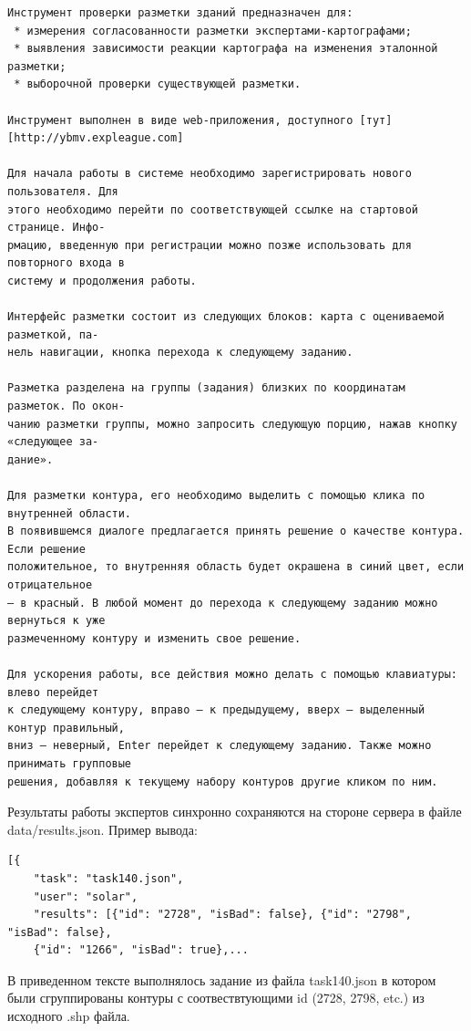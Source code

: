 \documentclass[12pt]{article}
\begin{document}
{\footnotesize\begin{verbatim}
Инструмент проверки разметки зданий предназначен для:
 * измерения согласованности разметки экспертами-картографами;
 * выявления зависимости реакции картографа на изменения эталонной разметки;
 * выборочной проверки существующей разметки.

Инструмент выполнен в виде web-приложения, доступного [тут][http://ybmv.expleague.com]

Для начала работы в системе необходимо зарегистрировать нового пользователя. Для
этого необходимо перейти по соответствующей ссылке на стартовой странице. Инфо-
рмацию, введенную при регистрации можно позже использовать для повторного входа в
систему и продолжения работы.

Интерфейс разметки состоит из следующих блоков: карта с оцениваемой разметкой, па-
нель навигации, кнопка перехода к следующему заданию.

Разметка разделена на группы (задания) близких по координатам разметок. По окон-
чанию разметки группы, можно запросить следующую порцию, нажав кнопку «следующее за-
дание».

Для разметки контура, его необходимо выделить с помощью клика по внутренней области.
В появившемся диалоге предлагается принять решение о качестве контура. Если решение
положительное, то внутренняя область будет окрашена в синий цвет, если отрицательное
— в красный. В любой момент до перехода к следующему заданию можно вернуться к уже
размеченному контуру и изменить свое решение.

Для ускорения работы, все действия можно делать с помощью клавиатуры: влево перейдет
к следующему контуру, вправо — к предыдущему, вверх — выделенный контур правильный,
вниз — неверный, Enter перейдет к следующему заданию. Также можно принимать групповые
решения, добавляя к текущему набору контуров другие кликом по ним.
\end{verbatim}}

Результаты работы экспертов синхронно сохраняются на стороне сервера в файле data/results.json. Пример вывода:
{\footnotesize
\begin{verbatim}
[{
    "task": "task140.json",
    "user": "solar",
    "results": [{"id": "2728", "isBad": false}, {"id": "2798", "isBad": false},
    {"id": "1266", "isBad": true},...
\end{verbatim}
}
В приведенном тексте выполнялось задание из файла task140.json в котором были сгруппированы контуры с соотвествтующими id (2728, 2798, etc.) из исходного .shp файла.
\end{document}
